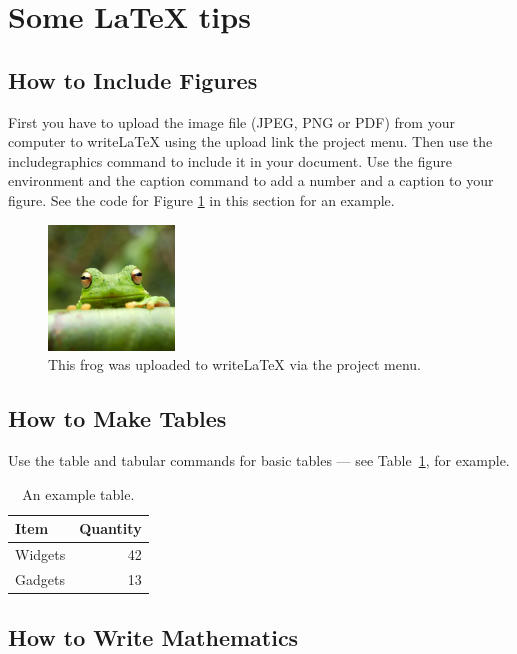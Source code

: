 \documentclass[a4paper]{article}
\begin{document}
\newpage
\section{Some LaTeX tips}
\label{sec:latex}
\subsection{How to Include Figures}

First you have to upload the image file (JPEG, PNG or PDF) from your computer to writeLaTeX using the upload link the project menu. Then use the includegraphics command to include it in your document. Use the figure environment and the caption command to add a number and a caption to your figure. See the code for Figure \ref{fig:frog} in this section for an example.

\begin{figure}[ht]
\centering
\includegraphics[width=0.3\textwidth]{frog.jpg}
\caption{\label{fig:frog}This frog was uploaded to writeLaTeX via the project menu.}
\end{figure}

\subsection{How to Make Tables}

Use the table and tabular commands for basic tables --- see Table~\ref{tab:widgets}, for example.

\begin{table}[ht]
\centering
\begin{tabular}{l|r}
Item & Quantity \\\hline
Widgets & 42 \\
Gadgets & 13
\end{tabular}
\caption{\label{tab:widgets}An example table.}
\end{table}

\subsection{How to Write Mathematics}
\end{document}
